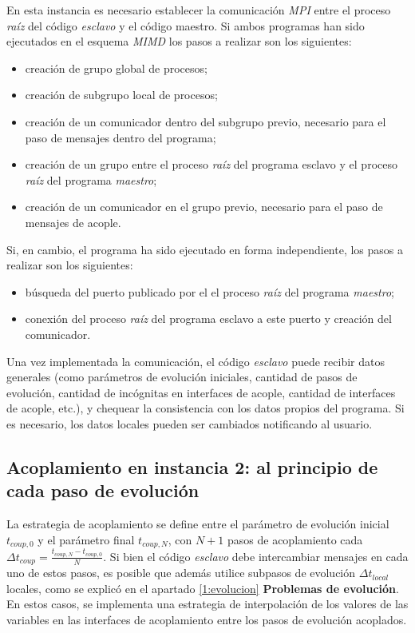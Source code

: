 En esta instancia es necesario establecer la comunicación \textit{MPI} entre el proceso \textit{raíz} del código \textit{esclavo} y el código maestro.
Si ambos programas han sido ejecutados en el esquema \textit{MIMD} los pasos a realizar son los siguientes:
\begin{itemize}
\item creación de grupo global de procesos;
\item creación de subgrupo local de procesos;
\item creación de un comunicador dentro del subgrupo previo, necesario para el paso de mensajes dentro del programa;
\item creación de un grupo entre el proceso \textit{raíz} del programa esclavo y el proceso \textit{raíz} del programa \textit{maestro};
\item creación de un comunicador en el grupo previo, necesario para el paso de mensajes de acople.
\end{itemize}
Si, en cambio, el programa ha sido ejecutado en forma independiente, los pasos a realizar son los siguientes:
\begin{itemize}
\item búsqueda del puerto publicado por el el proceso \textit{raíz} del programa \textit{maestro};
\item conexión del proceso \textit{raíz} del programa esclavo a este puerto y creación del comunicador.
\end{itemize}
Una vez implementada la comunicación, el código \textit{esclavo} puede recibir datos generales 
(como parámetros de evolución iniciales, cantidad de pasos de evolución, cantidad de incógnitas en interfaces de acople, cantidad de interfaces de acople, etc.),
y chequear la consistencia con los datos propios del programa.
Si es necesario, los datos locales pueden ser cambiados notificando al usuario.

\subsection*{Acoplamiento en instancia 2: al principio de cada paso de evolución}

La estrategia de acoplamiento se define entre el parámetro de evolución inicial $t_{coup,0}$ y el parámetro final $t_{coup,N}$,
con $N+1$ pasos de acoplamiento cada $\Delta t_{coup}=\frac{t_{coup,N} - t_{coup,0}}{N}$.
Si bien el código \textit{esclavo} debe intercambiar mensajes en cada uno de estos pasos, es posible que además utilice subpasos de evolución $\Delta t_{local}$ locales, como se explicó en el apartado \ref{1:evolucion}  \textbf{Problemas de evolución}. En estos casos, se implementa una estrategia de interpolación de los valores de las variables en las interfaces de acoplamiento entre los pasos de evolución acoplados.

